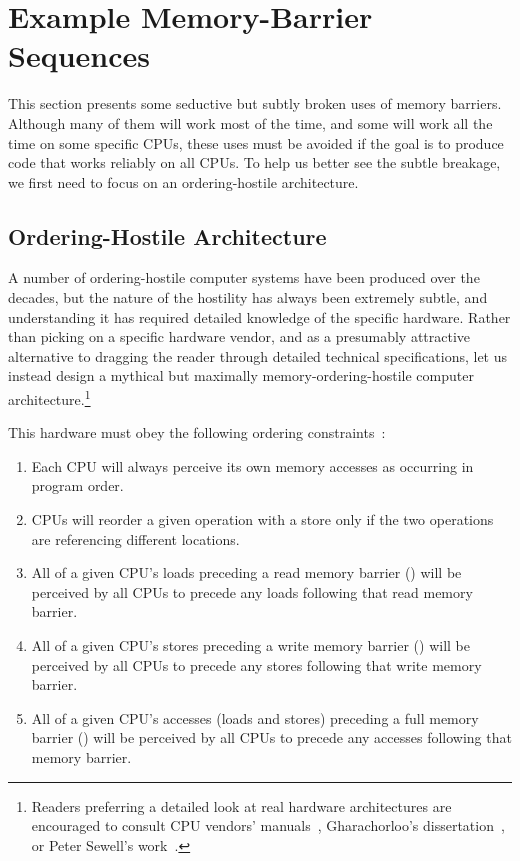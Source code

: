 \section{Example Memory-Barrier Sequences}
\label{sec:app:whymb:Example Memory-Barrier Sequences}

This section presents some seductive but subtly broken uses of
memory barriers.
Although many of them will work most of the time, and some will
work all the time on some specific CPUs, these uses must be avoided
if the goal is to produce code that works reliably on all CPUs.
To help us better see the subtle breakage, we first need to focus
on an ordering-hostile architecture.

\subsection{Ordering-Hostile Architecture}
\label{sec:app:whymb:Ordering-Hostile Architecture}

A number of ordering-hostile computer systems have been produced over
the decades,
but the nature of the hostility has always been extremely subtle,
and understanding it has required detailed knowledge of the specific
hardware.
Rather than picking on a specific hardware vendor, and as a presumably
attractive alternative to dragging the reader through detailed
technical specifications, let us instead design a mythical but maximally
memory-ordering-hostile computer architecture.\footnote{
	Readers preferring a detailed look at real hardware
	architectures are encouraged to consult CPU vendors'
	manuals~\cite{ALPHA95,AMDOpteron02,IntelItanium02v2,PowerPC94,MichaelLyons02a,SPARC94,IntelXeonV3-96a,IntelXeonV2b-96a,IBMzSeries04a},
	Gharachorloo's dissertation~\cite{Gharachorloo95}, or
	Peter Sewell's work~\cite{PeterSewell2010weakmemory}.}

This hardware must obey the following ordering
constraints~\cite{PaulMcKenney2005i,PaulMcKenney2005j}:
\begin{enumerate}
\item	Each CPU will always perceive its own memory accesses
	as occurring in program order.
\item	CPUs will reorder a given operation with a store only
	if the two operations are referencing different locations.
\item	All of a given CPU's loads preceding a read memory barrier
	() will be perceived by all CPUs to precede
	any loads following that read memory barrier.
\item	All of a given CPU's stores preceding a write memory barrier
	() will be perceived by all CPUs to precede
	any stores following that write memory barrier.
\item	All of a given CPU's accesses (loads and stores) preceding a
	full memory barrier
	() will be perceived by all CPUs to precede
	any accesses following that memory barrier.
\end{enumerate}

